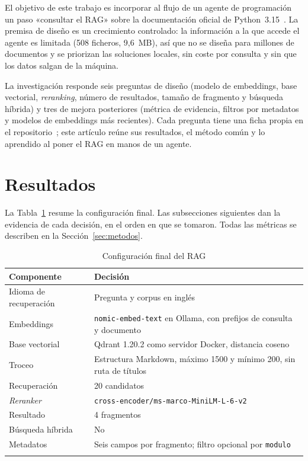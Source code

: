 \documentclass[pdflatex,sn-mathphys-num]{sn-jnl}
\begin{document}
El objetivo de este trabajo es incorporar al flujo de un agente de programación un paso «consultar el RAG» sobre la documentación oficial de Python~3.15~\cite{pythondocs}. La premisa de diseño es un crecimiento controlado: la información a la que accede el agente es limitada (508 ficheros, 9,6~MB), así que no se diseña para millones de documentos y se priorizan las soluciones locales, sin coste por consulta y sin que los datos salgan de la máquina.

La investigación responde seis preguntas de diseño (modelo de embeddings, base vectorial, \emph{reranking}, número de resultados, tamaño de fragmento y búsqueda híbrida) y tres de mejora posteriores (métrica de evidencia, filtros por metadatos y modelos de embeddings más recientes). Cada pregunta tiene una ficha propia en el repositorio~\cite{repo}; este artículo reúne sus resultados, el método común y lo aprendido al poner el RAG en manos de un agente.

\section{Resultados}\label{sec:resultados}

La Tabla~\ref{tab:config} resume la configuración final. Las subsecciones siguientes dan la evidencia de cada decisión, en el orden en que se tomaron. Todas las métricas se describen en la Sección~\ref{sec:metodos}.

\begin{table}[h]
\caption{Configuración final del RAG}\label{tab:config}
\begin{tabular}{@{}ll@{}}
\toprule
Componente & Decisión \\
\midrule
Idioma de recuperación & Pregunta y corpus en inglés \\
Embeddings & \texttt{nomic-embed-text} en Ollama, con prefijos de consulta y documento \\
Base vectorial & Qdrant 1.20.2 como servidor Docker, distancia coseno \\
Troceo & Estructura Markdown, máximo 1500 y mínimo 200, sin ruta de títulos \\
Recuperación & 20 candidatos \\
\emph{Reranker} & \texttt{cross-encoder/ms-marco-MiniLM-L-6-v2} \\
Resultado & 4 fragmentos \\
Búsqueda híbrida & No \\
Metadatos & Seis campos por fragmento; filtro opcional por \texttt{modulo} \\
\botrule
\end{tabular}
\end{table}
\end{document}
